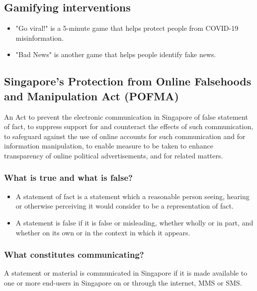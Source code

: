 \documentclass[11pt]{article}
\begin{document}
\subsection{Gamifying interventions}
\label{sec:orge8461ea}
\begin{itemize}
\item "Go viral!" is a 5-minute game that helps protect people from COVID-19 misinformation.
\item "Bad News" is another game that helps people identify fake news.
\end{itemize}
\subsection{Singapore's Protection from Online Falsehoods and Manipulation Act (POFMA)}
\label{sec:orgef29d0a}
An Act to prevent the electronic communication in Singapore of false statement of fact, to suppress support for and counteract the effects of such communication, to safeguard against the use of online accounts for such communication and for information manipulation, to enable measure to be taken to enhance transparency of online political advertisements, and for related matters.
\subsubsection{What is true and what is false?}
\label{sec:orge42b246}
\begin{itemize}
\item A statement of fact is a statement which a reasonable person seeing, hearing or otherwise perceiving it would consider to be a representation of fact.
\item A statement is false if it is false or misleading, whether wholly or in part, and whether on its own or in the context in which it appears.
\end{itemize}
\subsubsection{What constitutes communicating?}
\label{sec:org9363fdd}
A statement or material is communicated in Singapore if it is made available to one or more end-users in Singapore on or through the internet, MMS or SMS.

\clearpage
\end{document}
